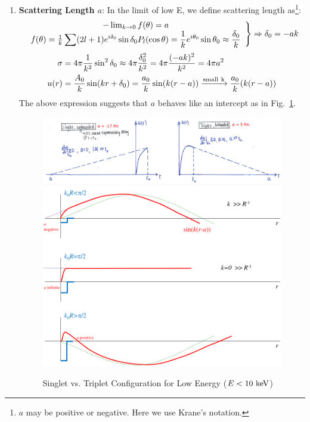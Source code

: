 \documentclass{school-22.101-notes}
\begin{document}
\begin{enumerate}
\item \textbf{Scattering Length $a$}: In the limit of low E, we define scattering length as\footnote{$a$ may be positive or negative. Here we use Krane's notation.}:
\begin{align}
\left. \begin{array}{c}
- \lim_{k\to 0} f(\theta) = a  \\
f(\theta) = \frac{1}{k} \displaystyle\sum (2l+1) e^{i \delta_0} \sin \delta_0  P_l (\cos \theta) = \frac{1}{k} e^{i\theta_0} \sin \theta_0  \approx \frac{\delta_0}{k} 
\end{array} 
\right\} \Rightarrow \delta_0 = -ak
\end{align}
\begin{align}
\sigma &= 4 \pi \frac{1}{k^2} \sin^2 \delta_0 \approx 4 \pi \frac{\delta_0^2}{k^2} =  4 \pi \frac{(-ak)^2}{k^2} = 4 \pi a^2 \\
u(r) &= \frac{A_0}{k} \sin(kr + \delta_0) = \frac{a_0}{k} \sin (k(r-a)) \xrightarrow{\mathrm{small \mbox{ } k}} \frac{a_0}{k} (k(r-a))
\end{align} 
The above expression suggests that $a$ behaves like an intercept as in Fig.~\ref{scattering-s-wave}. 

\begin{figure}
  \centering
    \includegraphics[width=7in]{images/scattering/s-wave-singlet-triplet.png}
    \\
    \includegraphics[width=5in]{images/scattering/s-wave-singlet-triplet-2.png}
    \caption{Singlet vs. Triplet Configuration for Low Energy ($E<10 \mbox{ } \mathrm{keV}$)\label{scattering-s-wave}}
\end{figure}


\end{enumerate}
\end{document}
